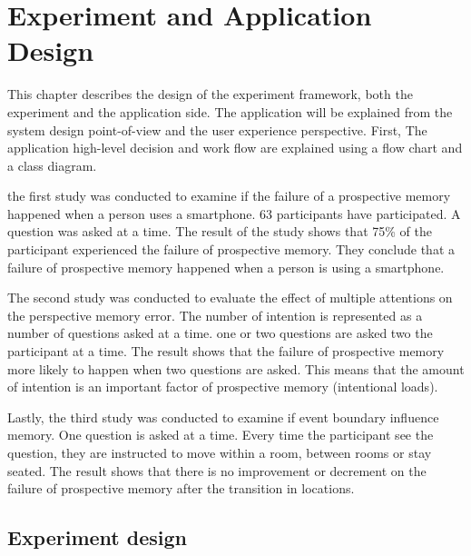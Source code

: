 \chapter{Experiment and Application Design}




This chapter describes the design of the experiment framework, both the experiment and the application side.
The application will be explained from the system design point-of-view and the user experience perspective. First,
The application high-level decision and work flow are explained using a flow chart and a class diagram.


the first study was conducted to examine if the failure of a prospective memory happened when a person uses a smartphone.
63 participants have participated. A question was asked at a time.
The result of the study shows that 75\% of the participant experienced the failure of prospective memory.
They conclude that a failure of prospective memory happened when a person is using a smartphone.


The second study was conducted to evaluate the effect of multiple attentions on the perspective memory error.
The number of intention is represented as a number of questions asked at a time.
one or two questions are asked two the participant at a time.
The result shows that the failure of prospective memory more likely to
happen when two questions are asked. This means that the amount of intention is an important factor of prospective memory (intentional loads).

Lastly, the third study was conducted to examine if event boundary influence memory. One question is asked at a time.
Every time the participant see the question, they are instructed to move within a room, between rooms or stay seated.
The result shows that there is no improvement or decrement on the failure of prospective memory after the transition in locations.


\section{Experiment design}

